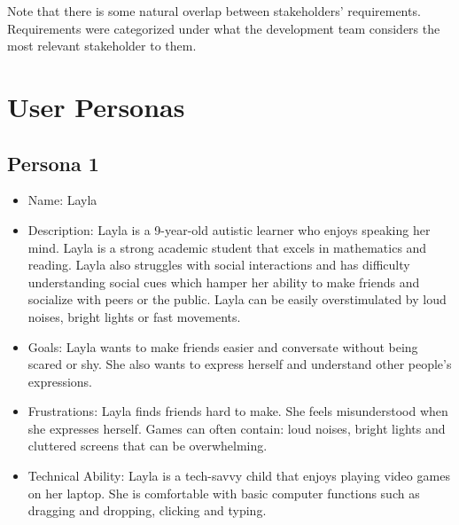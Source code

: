 \documentclass[12pt]{article}
\begin{document}
\noindent Note that there is some natural overlap between stakeholders' requirements. Requirements were categorized under what the development team considers the most relevant stakeholder to them.


\section{User Personas}

\subsection{Persona 1}
\begin{itemize}
\item Name: Layla
\item Description: Layla is a 9-year-old autistic learner who enjoys speaking her mind. Layla is a strong academic student that excels in mathematics and reading. Layla also struggles with social interactions and has difficulty understanding social cues which hamper her ability to make friends and socialize with peers or the public. Layla can be easily overstimulated by loud noises, bright lights or fast movements.
\item Goals: Layla wants to make friends easier and conversate without being scared or shy. She also wants to express herself and understand other people's expressions.
\item Frustrations: Layla finds friends hard to make. She feels misunderstood when she expresses herself. Games can often contain: loud noises, bright lights and cluttered screens that can be overwhelming.
\item Technical Ability: Layla is a tech-savvy child that enjoys playing video games on her laptop. She is comfortable with basic computer functions such as dragging and dropping, clicking and typing.
\end{itemize}
\end{document}
